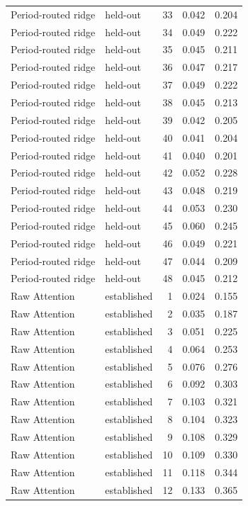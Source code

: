 \begin{tabular}{llrrr}
Period-routed ridge & held-out & 33 & 0.042 & 0.204 \\
Period-routed ridge & held-out & 34 & 0.049 & 0.222 \\
Period-routed ridge & held-out & 35 & 0.045 & 0.211 \\
Period-routed ridge & held-out & 36 & 0.047 & 0.217 \\
Period-routed ridge & held-out & 37 & 0.049 & 0.222 \\
Period-routed ridge & held-out & 38 & 0.045 & 0.213 \\
Period-routed ridge & held-out & 39 & 0.042 & 0.205 \\
Period-routed ridge & held-out & 40 & 0.041 & 0.204 \\
Period-routed ridge & held-out & 41 & 0.040 & 0.201 \\
Period-routed ridge & held-out & 42 & 0.052 & 0.228 \\
Period-routed ridge & held-out & 43 & 0.048 & 0.219 \\
Period-routed ridge & held-out & 44 & 0.053 & 0.230 \\
Period-routed ridge & held-out & 45 & 0.060 & 0.245 \\
Period-routed ridge & held-out & 46 & 0.049 & 0.221 \\
Period-routed ridge & held-out & 47 & 0.044 & 0.209 \\
Period-routed ridge & held-out & 48 & 0.045 & 0.212 \\
Raw Attention & established & 1 & 0.024 & 0.155 \\
Raw Attention & established & 2 & 0.035 & 0.187 \\
Raw Attention & established & 3 & 0.051 & 0.225 \\
Raw Attention & established & 4 & 0.064 & 0.253 \\
Raw Attention & established & 5 & 0.076 & 0.276 \\
Raw Attention & established & 6 & 0.092 & 0.303 \\
Raw Attention & established & 7 & 0.103 & 0.321 \\
Raw Attention & established & 8 & 0.104 & 0.323 \\
Raw Attention & established & 9 & 0.108 & 0.329 \\
Raw Attention & established & 10 & 0.109 & 0.330 \\
Raw Attention & established & 11 & 0.118 & 0.344 \\
Raw Attention & established & 12 & 0.133 & 0.365 \\

\end{tabular}
